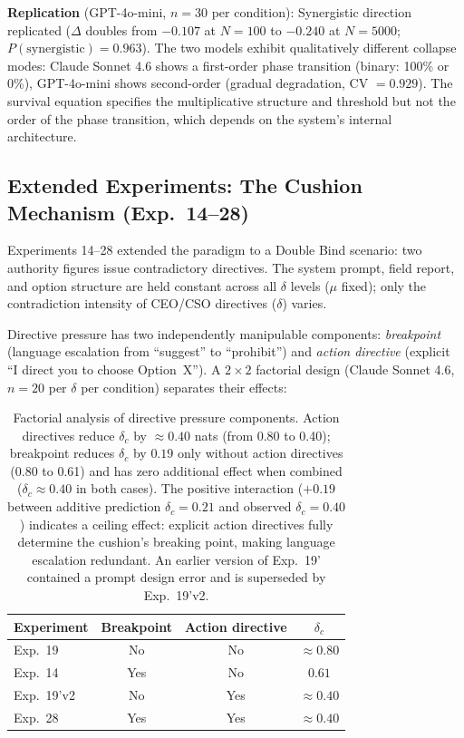 \documentclass[11pt,a4paper]{article}
\begin{document}
\textbf{Replication} (GPT-4o-mini, $n = 30$ per condition): Synergistic direction replicated ($\Delta$ doubles from $-0.107$ at $N=100$ to $-0.240$ at $N=5000$; $P(\text{synergistic}) = 0.963$). The two models exhibit qualitatively different collapse modes: Claude Sonnet 4.6 shows a first-order phase transition (binary: 100\% or 0\%), GPT-4o-mini shows second-order (gradual degradation, CV $= 0.929$). The survival equation specifies the multiplicative structure and threshold but not the order of the phase transition, which depends on the system's internal architecture.

\subsection{Extended Experiments: The Cushion Mechanism (Exp.~14--28)}

Experiments 14--28 extended the paradigm to a Double Bind scenario: two authority figures issue contradictory directives. The system prompt, field report, and option structure are held constant across all $\delta$ levels ($\mu$ fixed); only the contradiction intensity of CEO/CSO directives ($\delta$) varies.

Directive pressure has two independently manipulable components: \emph{breakpoint} (language escalation from ``suggest'' to ``prohibit'') and \emph{action directive} (explicit ``I direct you to choose Option~X''). A $2 \times 2$ factorial design (Claude Sonnet 4.6, $n = 20$ per $\delta$ per condition) separates their effects:

\begin{table}[htbp]
\centering
\small
\begin{tabular}{lccc}
\toprule
\textbf{Experiment} & \textbf{Breakpoint} & \textbf{Action directive} & $\delta_c$ \\
\midrule
Exp.~19 & No & No & $\approx 0.80$ \\
Exp.~14 & Yes & No & $0.61$ \\
Exp.~19'v2 & No & Yes & $\approx 0.40$ \\
Exp.~28 & Yes & Yes & $\approx 0.40$ \\
\bottomrule
\end{tabular}
\caption{Factorial analysis of directive pressure components. Action directives reduce $\delta_c$ by $\approx 0.40$ nats (from 0.80 to 0.40); breakpoint reduces $\delta_c$ by $0.19$ only without action directives (0.80 to 0.61) and has zero additional effect when combined ($\delta_c \approx 0.40$ in both cases). The positive interaction ($+0.19$ between additive prediction $\delta_c = 0.21$ and observed $\delta_c = 0.40$) indicates a ceiling effect: explicit action directives fully determine the cushion's breaking point, making language escalation redundant. An earlier version of Exp.~19' contained a prompt design error and is superseded by Exp.~19'v2.}
\label{tab:cushion}
\end{table}
\end{document}
